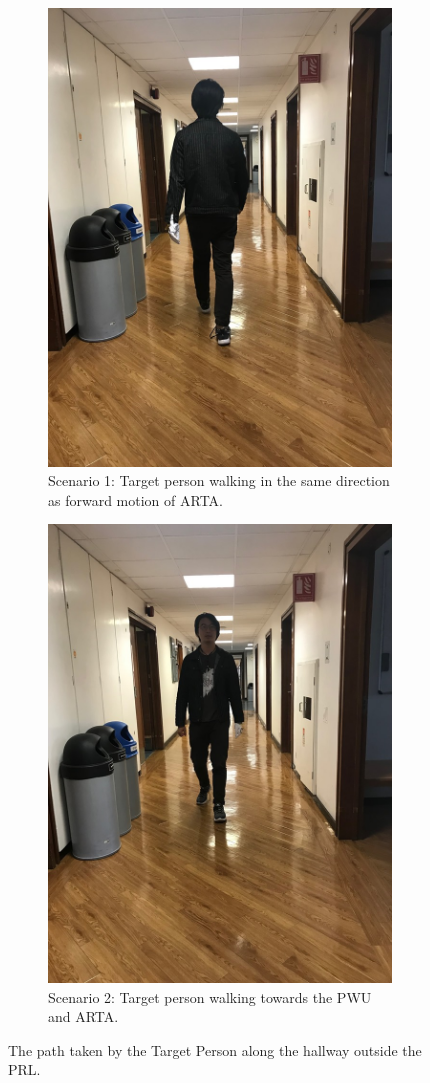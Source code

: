 \begin{figure}[ht]
    \begin{subfigure}[b]{.48\textwidth}
        \centering
        \includegraphics[width=0.5\linewidth]{img/chapter6_test/zihanBack.jpg}
        \caption{Scenario 1: Target person walking in the same direction as forward motion of ARTA.}
    \end{subfigure}%
    \hspace{\fill} 
    \begin{subfigure}[b]{.48\textwidth}
        \centering
        \includegraphics[width=0.5\linewidth]{img/chapter6_test/zihanForward.jpg}
        \caption{Scenario 2: Target person walking towards the PWU and ARTA.}
    \end{subfigure}
    \vspace{-1\baselineskip}
    \begin{center}
        \caption{The path taken by the Target Person along the hallway outside the PRL.}
        \label{fig:zihanBackForward}
    \end{center}
    \vspace{-2\baselineskip}
\end{figure}

